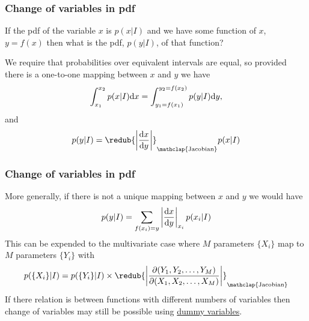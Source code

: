 \begin{frame}

\frametitle{Change of variables in pdf}
\label{changeofvariablesinpdf}

If the pdf of the variable $x$ is $p(x|I)$ and we have some function of $x$, $y=f(x)$ then what is the
pdf, $p(y|I)$, of that function?

We require that probabilities over equivalent intervals are equal, so provided there is a one-to-one
mapping between $x$ and $y$ we have
\[
\int_{x_1}^{x_2} p(x|I) {\rm d}x = \int_{y_1=f(x_1)}^{y_2=f(x_2)} p(y|I) {\rm d}y,
\]
and
\[
p(y|I) = \redub{\left|\frac{{\rm d}x}{{\rm d} y}\right|}_{\mathclap{\text{Jacobian}}}p(x|I)
\]

\end{frame}

\begin{frame}

\frametitle{Change of variables in pdf}
\label{changeofvariablesinpdf}

More generally, if there is not a unique mapping between $x$ and $y$ we would have
\[
p(y|I) = \sum_{f(x_i)=y} \left|\frac{{\rm d}x}{{\rm d} y}\right|_{x_i} p(x_i|I)
\]
This can be expended to the multivariate case where $M$ parameters $\{X_i\}$ map to $M$ parameters $\{Y_i\}$ with
\[
p(\{X_i\}|I) = p(\{Y_i\}|I) \times \redub{\left| \frac{\partial (Y_1, Y_2, \ldots, Y_M) }{\partial (X_1, X_2, \ldots, X_M) } \right|}_{\mathclap{\text{Jacobian}}}
\]
If there relation is between functions with different numbers of variables then change of variables may still be
possible using \href{http://en.wikipedia.org/wiki/Probability\_density\_function\#Example:\_Quotient_distribution}{dummy variables}.

\end{frame}

